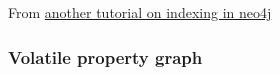 \documentclass{article}
\begin{document}
From \href{https://www.quackit.com/neo4j/tutorial/neo4j_create_an_index_using_cypher.cfm#google_vignette}{another tutorial on indexing in neo4j}

\subsubsection{Volatile property graph}

\end{document}
